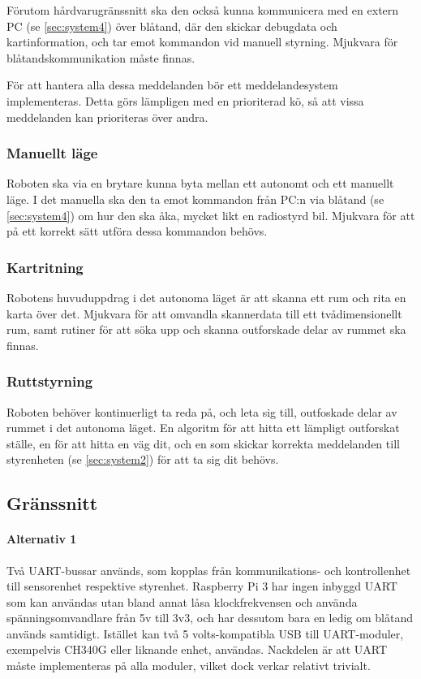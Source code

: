 \documentclass[a4paper,11pt]{article}
\begin{document}
Förutom hårdvarugränssnitt ska den också kunna kommunicera med en extern PC (se \ref{sec:system4}) över blåtand, där den skickar debugdata och kartinformation, och tar emot kommandon vid manuell styrning. Mjukvara för blåtandskommunikation måste finnas.

För att hantera alla dessa meddelanden bör ett meddelandesystem implementeras. Detta görs lämpligen med en prioriterad kö, så att vissa meddelanden kan prioriteras över andra.

\subsubsection{Manuellt läge}
Roboten ska via en brytare kunna byta mellan ett autonomt och ett manuellt läge. I det manuella ska den ta emot kommandon från PC:n via blåtand (se \ref{sec:system4}) om hur den ska åka, mycket likt en radiostyrd bil. Mjukvara för att på ett korrekt sätt utföra dessa kommandon behövs.

\subsubsection{Kartritning}
Robotens huvuduppdrag i det autonoma läget är att skanna ett rum och rita en karta över det. Mjukvara för att omvandla skannerdata till ett tvådimensionellt rum, samt rutiner för att söka upp och skanna outforskade delar av rummet ska finnas.

\subsubsection{Ruttstyrning}
Roboten behöver kontinuerligt ta reda på, och leta sig till, outfoskade delar av rummet i det autonoma läget. En algoritm för att hitta ett lämpligt outforskat ställe, en för att hitta en väg dit, och en som skickar korrekta meddelanden till styrenheten (se \ref{sec:system2}) för att ta sig dit behövs.

\subsection{Gränssnitt} \label{ssec:brainInterface}

\paragraph{Alternativ 1}
Två UART-bussar används, som kopplas från kommunikations- och kontrollenhet till sensorenhet respektive styrenhet. Raspberry Pi 3 har ingen inbyggd UART som kan användas utan bland annat låsa klockfrekvensen och använda spänningsomvandlare från 5v till 3v3, och har dessutom bara en ledig om blåtand används samtidigt. Istället kan två 5 volts-kompatibla USB till UART-moduler, exempelvis CH340G eller liknande enhet, användas. Nackdelen är att UART måste implementeras på alla moduler, vilket dock verkar relativt trivialt. %
\end{document}
